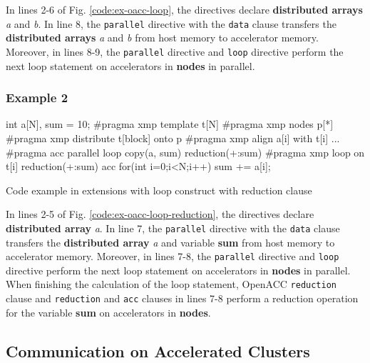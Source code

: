 In lines 2-6 of Fig. \ref{code:ex-oacc-loop},
the directives declare {\bf distributed arrays} {\it a} and {\it b}.
In line 8,
the {\tt parallel} directive with the {\tt data} clause transfers the {\bf distributed arrays} {\it a} and {\it b} from host memory to accelerator memory.
Moreover,
in lines 8-9,
the {\tt parallel} directive and {\XMP} {\tt loop} directive perform the next loop statement on accelerators in {\bf nodes} in parallel.

\subsubsection*{Example 2}
\begin{myfigure}
\begin{center}
\begin{XACCCexampleL}
int a[N], sum = 10;
#pragma xmp template t[N]
#pragma xmp nodes p[*]
#pragma xmp distribute t[block] onto p
#pragma xmp align a[i] with t[i]
...
#pragma acc parallel loop copy(a, sum) reduction(+:sum)
#pragma xmp loop on t[i] reduction(+:sum) acc
for(int i=0;i<N;i++){
  sum += a[i];
}
\end{XACCCexampleL}
\end{center}
\caption{Code example in {\XMP} extensions with {\OACC} loop construct with reduction clause}\label{code:ex-oacc-loop-reduction}
\end{myfigure}

In lines 2-5 of Fig. \ref{code:ex-oacc-loop-reduction},
the directives declare {\bf distributed array} {\it a}.
In line 7,
the {\tt parallel} directive with the {\tt data} clause transfers the {\bf distributed array} {\it a} and variable {\bf sum} from host memory to accelerator memory.
Moreover,
in lines 7-8,
the {\tt parallel} directive and {\XMP} {\tt loop} directive perform the next loop statement on accelerators in {\bf nodes} in parallel.
When finishing the calculation of the loop statement,
OpenACC {\tt reduction} clause and {\XMP} {\tt reduction} and {\tt acc} clauses in lines 7-8 perform a reduction operation for the variable {\bf sum} on accelerators in {\bf nodes}.

\subsection{Communication on Accelerated Clusters}
